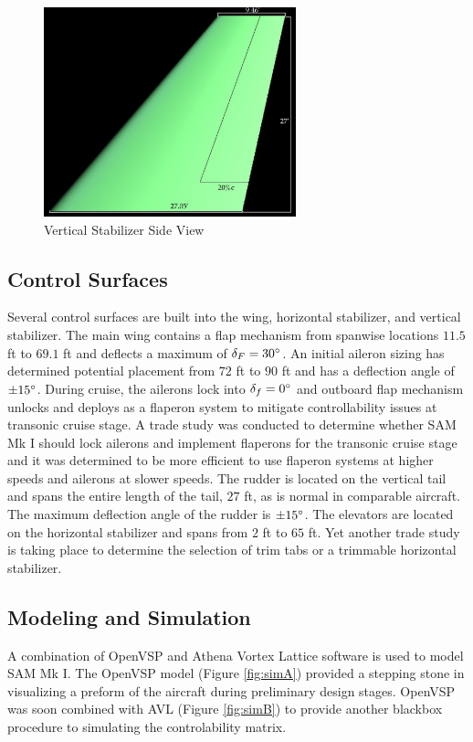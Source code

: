 \begin{figure}[!h]
    \centering
    \includegraphics[width=0.65\textwidth]{Photos/stab/vtail.jpg}
    \caption{Vertical Stabilizer Side View}
    \label{fig:vtailstab}
\end{figure}
\clearpage

\subsection{Control Surfaces}
Several control surfaces are built into the wing, horizontal stabilizer, and vertical stabilizer.  The main wing contains a flap mechanism from spanwise locations $11.5$ ft to $69.1$ ft and deflects a maximum of $\delta_F = 30\degree$.  An initial aileron sizing has determined potential placement from $72$ ft to $90$ ft and has a deflection angle of $\pm 15\degree$.  During cruise, the ailerons lock into $\delta_f = 0\degree$ and outboard flap mechanism unlocks and deploys as a flaperon system to mitigate controllability issues at transonic cruise stage.  A trade study was conducted to determine whether SAM Mk I should lock ailerons and implement flaperons for the transonic cruise stage and it was determined to be more efficient to use flaperon systems at higher speeds and ailerons at slower speeds.  The rudder is located on the vertical tail and spans the entire length of the tail, $27$ ft, as is normal in comparable aircraft.  The maximum deflection angle of the rudder is $\pm 15\degree$.  The elevators are located on the horizontal stabilizer and spans from $2$ ft to $65$ ft.  Yet another trade study is taking place to determine the selection of trim tabs or a trimmable horizontal stabilizer.

\subsection{Modeling and Simulation}
A combination of OpenVSP and Athena Vortex Lattice software is used to model SAM Mk I.  The OpenVSP model (Figure \ref{fig:simA}) provided a stepping stone in visualizing a preform of the aircraft during preliminary design stages.  OpenVSP was soon combined with AVL (Figure \ref{fig:simB}) to provide another blackbox procedure to simulating the controlability matrix. 


